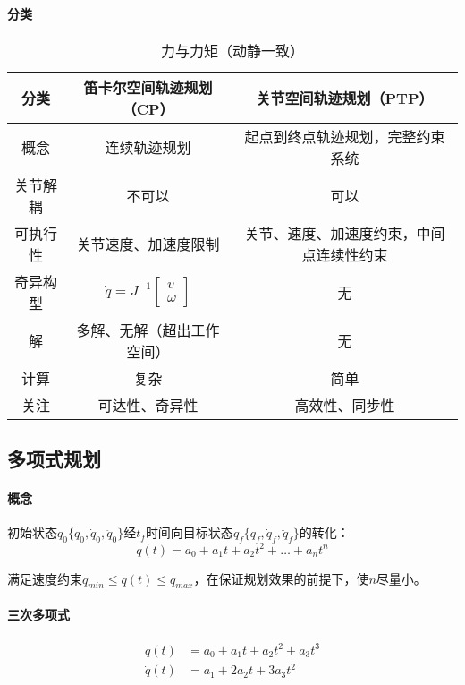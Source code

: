 \documentclass[
12pt, %
a4paper, 
oneside, %
headinclude,footinclude, %
]{scrartcl}
\begin{document}
\paragraph{分类}
\begin{table}[H]
\centering
\begin{tabular}{c|c|c}
\hline
分类 & 笛卡尔空间轨迹规划（CP） & 关节空间轨迹规划（PTP） \\
\hline
概念 & 连续轨迹规划 & 起点到终点轨迹规划，完整约束系统 \\
关节解耦 & 不可以 & 可以 \\
可执行性 & 关节速度、加速度限制 & 关节、速度、加速度约束，中间点连续性约束 \\
奇异构型 & $ \dot{q} = J^{-1} \begin{bmatrix} v \\ \omega \end{bmatrix} $ & 无 \\
解 & 多解、无解（超出工作空间） & 无 \\
计算 & 复杂 & 简单 \\
关注 & 可达性、奇异性 & 高效性、同步性 \\
\hline
\end{tabular}
\caption{力与力矩（动静一致）}
\end{table}
\subsection[多项式规划]{多项式规划}
\paragraph{概念}
初始状态$ q_0\{q_0, \dot{q}_0, \ddot{q}_0\} $经$ t_f $时间向目标状态$ q_f\{q_f, \dot{q}_f, \ddot{q}_f\} $的转化：
$$ q(t) = a_0 + a_1 t + a_2 t^2 + \dots + a_n t^n $$

满足速度约束$ q_{min} \leq q(t) \leq q_{max} $，在保证规划效果的前提下，使$ n $尽量小。
\paragraph{三次多项式}
\begin{align*} 
q(t) &= a_0 + a_1 t + a_2 t^2 + a_3 t^3 \\
\dot{q}(t) &= a_1 + 2a_2 t + 3a_3 t^2
\end{align*}
\end{document}
